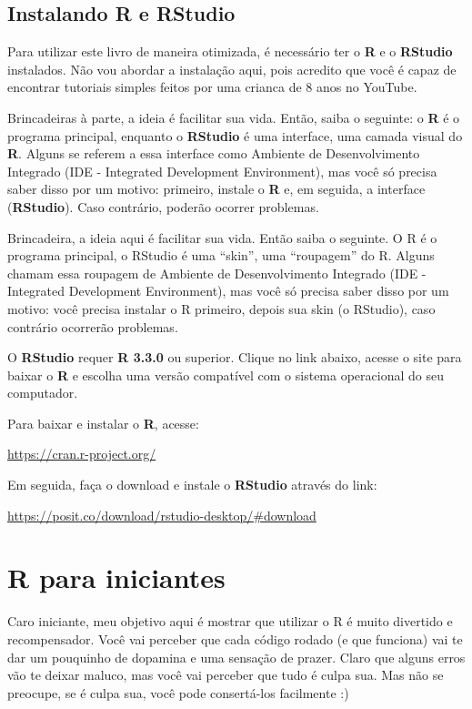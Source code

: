 \documentclass[
]{book}
\begin{document}
\hypertarget{instalando-r-e-rstudio}{%
\section{Instalando R e RStudio}\label{instalando-r-e-rstudio}}

Para utilizar este livro de maneira otimizada, é necessário ter o \textbf{R} e o \textbf{RStudio} instalados. Não vou abordar a instalação aqui, pois acredito que você é capaz de encontrar tutoriais simples feitos por uma crianca de 8 anos no YouTube.

Brincadeiras à parte, a ideia é facilitar sua vida. Então, saiba o seguinte: o \textbf{R} é o programa principal, enquanto o \textbf{RStudio} é uma interface, uma camada visual do \textbf{R}. Alguns se referem a essa interface como Ambiente de Desenvolvimento Integrado (IDE - Integrated Development Environment), mas você só precisa saber disso por um motivo: primeiro, instale o \textbf{R} e, em seguida, a interface (\textbf{RStudio}). Caso contrário, poderão ocorrer problemas.

Brincadeira, a ideia aqui é facilitar sua vida. Então saiba o seguinte. O R é o programa principal, o RStudio é uma ``skin'', uma ``roupagem'' do R. Alguns chamam essa roupagem de Ambiente de Desenvolvimento Integrado (IDE - Integrated Development Environment), mas você só precisa saber disso por um motivo: você precisa instalar o R primeiro, depois sua skin (o RStudio), caso contrário ocorrerão problemas.

O \textbf{RStudio} requer \textbf{R 3.3.0} ou superior. Clique no link abaixo, acesse o site para baixar o \textbf{R} e escolha uma versão compatível com o sistema operacional do seu computador.

Para baixar e instalar o \textbf{R}, acesse:

\url{https://cran.r-project.org/}

Em seguida, faça o download e instale o \textbf{RStudio} através do link:

\url{https://posit.co/download/rstudio-desktop/\#download}

\hypertarget{r-para-iniciantes}{%
\chapter{R para iniciantes}\label{r-para-iniciantes}}

Caro iniciante, meu objetivo aqui é mostrar que utilizar o R é muito divertido e recompensador. Você vai perceber que cada código rodado (e que funciona) vai te dar um pouquinho de dopamina e uma sensação de prazer. Claro que alguns erros vão te deixar maluco, mas você vai perceber que tudo é culpa sua. Mas não se preocupe, se é culpa sua, você pode consertá-los facilmente :)
\end{document}
